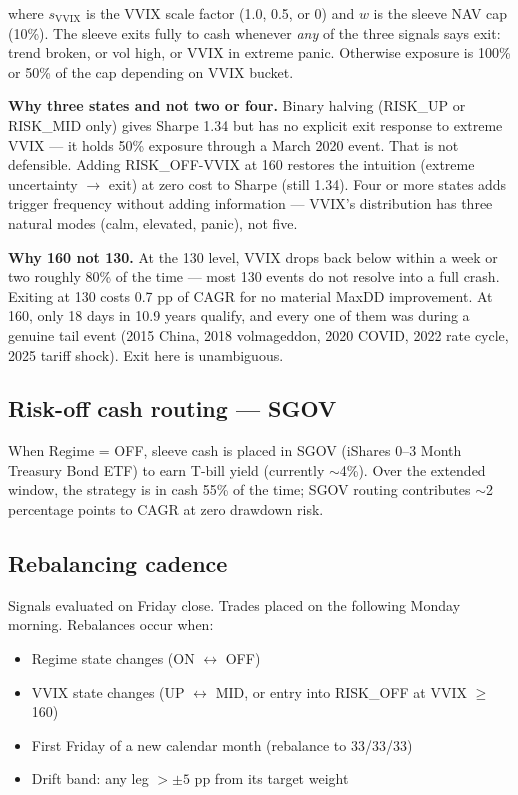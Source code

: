 \documentclass[11pt,a4paper]{article}
\begin{document}
where $s_{\text{VVIX}}$ is the VVIX scale factor (1.0, 0.5, or 0) and $w$ is the sleeve NAV cap (10\%). The sleeve exits fully to cash whenever \emph{any} of the three signals says exit: trend broken, or vol high, or VVIX in extreme panic. Otherwise exposure is 100\% or 50\% of the cap depending on VVIX bucket.

\textbf{Why three states and not two or four.} Binary halving (RISK\_UP or RISK\_MID only) gives Sharpe 1.34 but has no explicit exit response to extreme VVIX --- it holds 50\% exposure through a March 2020 event. That is not defensible. Adding RISK\_OFF-VVIX at 160 restores the intuition (extreme uncertainty $\to$ exit) at zero cost to Sharpe (still 1.34). Four or more states adds trigger frequency without adding information --- VVIX's distribution has three natural modes (calm, elevated, panic), not five.

\textbf{Why 160 not 130.} At the 130 level, VVIX drops back below within a week or two roughly 80\% of the time --- most 130 events do not resolve into a full crash. Exiting at 130 costs 0.7 pp of CAGR for no material MaxDD improvement. At 160, only 18 days in 10.9 years qualify, and every one of them was during a genuine tail event (2015 China, 2018 volmageddon, 2020 COVID, 2022 rate cycle, 2025 tariff shock). Exit here is unambiguous.

\subsection{Risk-off cash routing --- SGOV}

When Regime = OFF, sleeve cash is placed in SGOV (iShares 0--3 Month Treasury Bond ETF) to earn T-bill yield (currently $\sim$4\%). Over the extended window, the strategy is in cash 55\% of the time; SGOV routing contributes $\sim$2 percentage points to CAGR at zero drawdown risk.

\subsection{Rebalancing cadence}

Signals evaluated on Friday close. Trades placed on the following Monday morning. Rebalances occur when:
\begin{itemize}[noitemsep]
    \item Regime state changes (ON $\leftrightarrow$ OFF)
    \item VVIX state changes (UP $\leftrightarrow$ MID, or entry into RISK\_OFF at VVIX $\geq$ 160)
    \item First Friday of a new calendar month (rebalance to 33/33/33)
    \item Drift band: any leg $> \pm 5$ pp from its target weight
\end{itemize}
\end{document}
